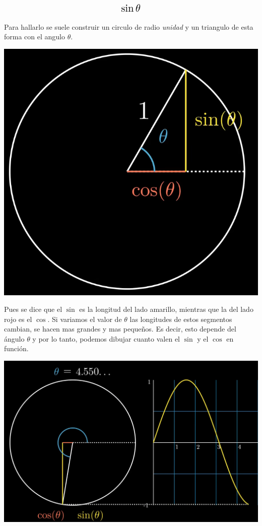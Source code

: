 \documentclass[12pt, a4paper, oneside]{article}
\begin{document}
\[
	\scalebox{1.5}{$\sin\theta$}\\
\]

Para hallarlo se suele construir un circulo de radio \textit{unidad} y un triangulo de esta forma con el angulo $\theta$.\\

{
\centering
\includegraphics[scale=0.3]{./images/theta}
\par
}

Pues se dice que el {\large $\sin$} es la longitud del lado amarillo,
mientras que la del lado rojo es el {\large $\cos$}. Si variamos el
valor de {\large $\theta$} las longitudes de estos segmentos cambian, se hacen mas grandes y mas pequeños. Es decir, esto depende del ángulo
{\large $\theta$} y por lo tanto, podemos dibujar cuanto valen el
	{\large $\sin$} y el {\large $\cos$} en función.\\
\par

{
	\centering
	\includegraphics[scale=0.3]{./images/function}
	\par
}
\end{document}
